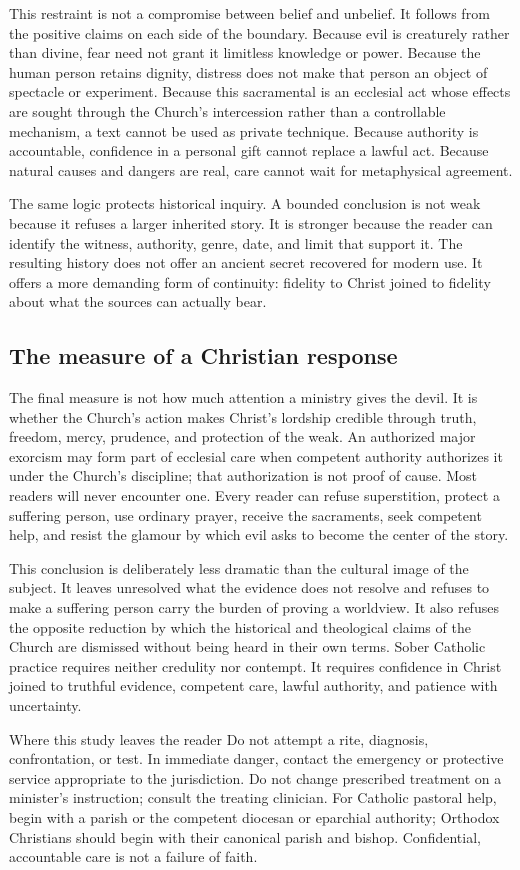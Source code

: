 This restraint is not a compromise between belief and unbelief. It follows
from the positive claims on each side of the boundary. Because evil is
creaturely rather than divine, fear need not grant it limitless knowledge or
power. Because the human person retains dignity, distress does not make that
person an object of spectacle or experiment. Because this sacramental is an
ecclesial act whose effects are sought through the Church's intercession rather
than a controllable mechanism, a text cannot be used as private technique.
Because authority is accountable, confidence in a
personal gift cannot replace a lawful act. Because natural causes and dangers
are real, care cannot wait for metaphysical agreement.

The same logic protects historical inquiry. A bounded conclusion is not weak
because it refuses a larger inherited story. It is stronger because the reader
can identify the witness, authority, genre, date, and limit that support it.
The resulting history does not offer an ancient secret recovered for modern
use. It offers a more demanding form of continuity: fidelity to Christ joined
to fidelity about what the sources can actually bear.

\subsection{The measure of a Christian response}

The final measure is not how much attention a ministry gives the devil. It is
whether the Church's action makes Christ's lordship credible through truth,
freedom, mercy, prudence, and protection of the weak. An authorized major
exorcism may form part of ecclesial care when competent authority authorizes it
under the Church's discipline; that authorization is not proof of cause. Most
readers will never encounter one. Every reader can
refuse superstition, protect a suffering person, use ordinary prayer, receive
the sacraments, seek competent help, and resist the glamour by which evil asks
to become the center of the story.

This conclusion is deliberately less dramatic than the cultural image of the
subject. It leaves unresolved what the evidence does not resolve and refuses
to make a suffering person carry the burden of proving a worldview. It also
refuses the opposite reduction by which the historical and theological claims
of the Church are dismissed without being heard in their own terms. Sober
Catholic practice requires neither credulity nor contempt. It requires
confidence in Christ joined to truthful evidence, competent care, lawful
authority, and patience with uncertainty.

\begin{studybox}{Where this study leaves the reader}
Do not attempt a rite, diagnosis, confrontation, or test. In immediate danger,
contact the emergency or protective service appropriate to the jurisdiction.
Do not change prescribed treatment on a minister's instruction; consult the
treating clinician. For Catholic pastoral help, begin with a parish or the
competent diocesan or eparchial authority; Orthodox Christians should begin
with their canonical parish and bishop. Confidential, accountable care is not
a failure of faith.
\end{studybox}
